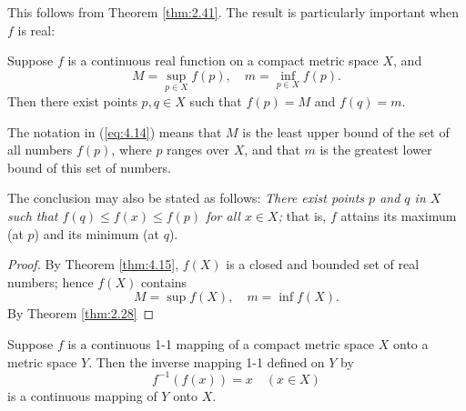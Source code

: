 This follows from Theorem \ref{thm:2.41}. 
The result is particularly important when $f$ is real:

\begin{thm}
    \label{thm:4.16}
    Suppose $f$ is a continuous real function on a compact metric space $X$, and
    \begin{equation}
        \label{eq:4.14}
        M = \sup_{p\in X} f(p), \quad
        m = \inf_{p\in X} f(p).
    \end{equation}
    Then there exist points $p, q \in X$ 
    such that $f(p) = M$ and $f(q) = m$.
\end{thm}

The notation in (\ref{eq:4.14}) means that 
$M$ is the least upper bound of the set of all numbers $f(p)$, 
where $p$ ranges over $X$, 
and that $m$ is the greatest lower bound of this set of numbers.

The conclusion may also be stated as follows: 
\emph{There exist points $p$ and $q$
in $X$ such that $f(q) \leq f(x) \leq f(p)$ for all $x \in X$;} 
that is, $f$ attains its maximum (at $p$) and its minimum (at $q$).

\begin{proof}
    By Theorem \ref{thm:4.15}, 
    $f(X)$ is a closed and bounded set of real numbers; 
    hence $f(X)$ contains
    \begin{equation*}
        M = \sup f(X), \quad
        m = \inf f(X).        
    \end{equation*}
    By Theorem \ref{thm:2.28}
\end{proof}

\begin{thm}
    \label{thm:4.17}
    Suppose $f$ is a continuous 1-1 mapping of a compact metric space $X$ onto a metric space $Y$. 
    Then the inverse mapping 1-1 defined on $Y$ by 
    \begin{equation*}
        f^{-1}(f(x)) = x \quad
        (x \in X)
    \end{equation*}
    is a continuous mapping of $Y$ onto $X$.
\end{thm}


